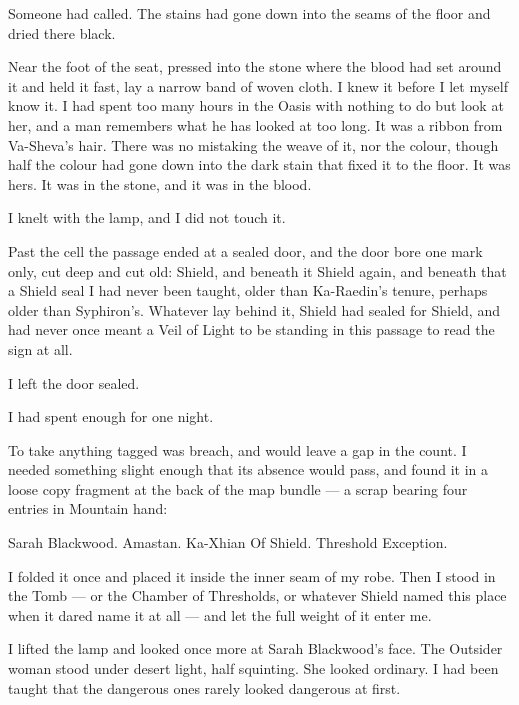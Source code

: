 Someone had called. The stains had gone down into the seams of the floor and dried there black.\par

Near the foot of the seat, pressed into the stone where the blood had set around it and held it fast, lay a narrow band of woven cloth. I knew it before I let myself know it. I had spent too many hours in the Oasis with nothing to do but look at her, and a man remembers what he has looked at too long. It was a ribbon from Va-Sheva's hair. There was no mistaking the weave of it, nor the colour, though half the colour had gone down into the dark stain that fixed it to the floor. It was hers. It was in the stone, and it was in the blood.\par

I knelt with the lamp, and I did not touch it.\par

Past the cell the passage ended at a sealed door, and the door bore one mark only, cut deep and cut old: Shield, and beneath it Shield again, and beneath that a Shield seal I had never been taught, older than Ka-Raedin's tenure, perhaps older than Syphiron's. Whatever lay behind it, Shield had sealed for Shield, and had never once meant a Veil of Light to be standing in this passage to read the sign at all.\par

I left the door sealed.

I had spent enough for one night.\par

To take anything tagged was breach, and would leave a gap in the count. I needed something slight enough that its absence would pass, and found it in a loose copy fragment at the back of the map bundle --- a scrap bearing four entries in Mountain hand:\par

Sarah Blackwood. Amastan. Ka-Xhian Of Shield. Threshold Exception.\par

I folded it once and placed it inside the inner seam of my robe. Then I stood in the Tomb --- or the Chamber of Thresholds, or whatever Shield named this place when it dared name it at all --- and let the full weight of it enter me.

I lifted the lamp and looked once more at Sarah Blackwood's face. The Outsider woman stood under desert light, half squinting. She looked ordinary. I had been taught that the dangerous ones rarely looked dangerous at first.\par

